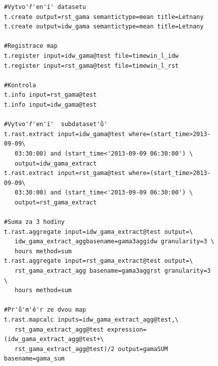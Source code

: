 \documentclass[a4paper,12pt,oneside]{report}
\begin{document}
\begin{figure}[h!]
\begin{footnotesize}
\lstset{extendedchars=false,
escapeinside=''}
\begin{lstlisting}[style=mybash]
#Vytvo'ř'en'í' datasetu
t.create output=rst_gama semantictype=mean title=Letnany
t.create output=idw_gama semantictype=mean title=Letnany

#Registrace map 
t.register input=idw_gama@test file=timewin_l_idw
t.register input=rst_gama@test file=timewin_l_rst

#Kontrola
t.info input=rst_gama@test                                                      
t.info input=idw_gama@test

#Vytvo'ř'en'í'  subdataset'ů'
t.rast.extract input=idw_gama@test where=(start_time>2013-09-09\
   03:30:00) and (start_time<'2013-09-09 06:30:00') \
   output=idw_gama_extract
t.rast.extract input=rst_gama@test where=(start_time>2013-09-09\
   03:30:00) and (start_time<'2013-09-09 06:30:00') \
   output=rst_gama_extract

#Suma za 3 hodiny
t.rast.aggregate input=idw_gama_extract@test output=\
   idw_gama_extract_aggbasename=gama3aggidw granularity=3 \
   hours method=sum
t.rast.aggregate input=rst_gama_extract@test output=\
   rst_gama_extract_agg basename=gama3aggrst granularity=3 \
   hours method=sum

#Pr'ů'm'ě'r ze dvou map
t.rast.mapcalc inputs=idw_gama_extract_agg@test,\
   rst_gama_extract_agg@test expression=(idw_gama_extract_agg@test+\
   rst_gama_extract_agg@test)/2 output=gamaSUM basename=gama_sum
   
   
\end{lstlisting}
\end{footnotesize} 
\end{figure}
\end{document}
